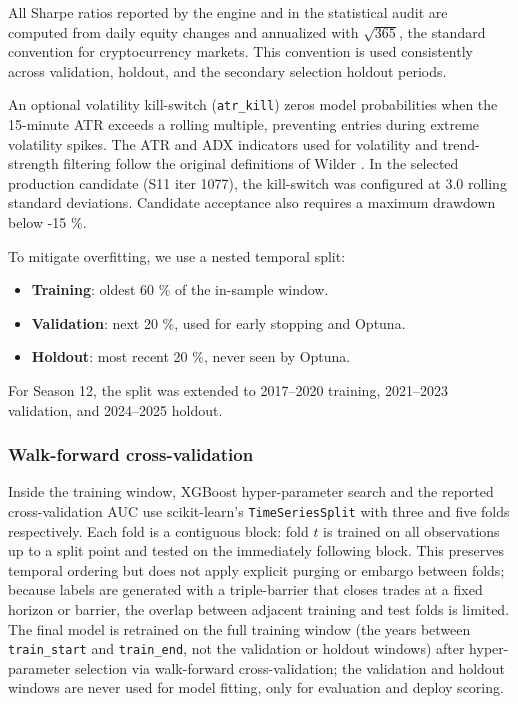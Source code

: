 \documentclass[analytics,article,submit,pdftex,moreauthors]{Definitions/mdpi}
\begin{document}
All Sharpe ratios reported by the engine and in the statistical audit are computed from daily equity changes and annualized with \(\sqrt{365}\), the standard convention for cryptocurrency markets. This convention is used consistently across validation, holdout, and the secondary selection holdout periods.

An optional volatility kill-switch (\texttt{atr\_kill}) zeros model probabilities when the 15-minute ATR exceeds a rolling multiple, preventing entries during extreme volatility spikes. The ATR and ADX indicators used for volatility and trend-strength filtering follow the original definitions of Wilder \citep{wilder_1978}. In the selected production candidate (S11 iter 1077), the kill-switch was configured at 3.0 rolling standard deviations. Candidate acceptance also requires a maximum drawdown below -15 \%.

To mitigate overfitting, we use a nested temporal split:

\begin{itemize}
\item
  \textbf{Training}: oldest 60 \% of the in-sample window.
\item
  \textbf{Validation}: next 20 \%, used for early stopping and Optuna.
\item
  \textbf{Holdout}: most recent 20 \%, never seen by Optuna.
\end{itemize}

For Season 12, the split was extended to 2017--2020 training, 2021--2023 validation, and 2024--2025 holdout.

\subsubsection{Walk-forward cross-validation}\label{walk-forward}

Inside the training window, XGBoost hyper-parameter search and the reported cross-validation AUC use scikit-learn's \texttt{TimeSeriesSplit} with three and five folds respectively. Each fold is a contiguous block: fold \(t\) is trained on all observations up to a split point and tested on the immediately following block. This preserves temporal ordering but does not apply explicit purging or embargo between folds; because labels are generated with a triple-barrier that closes trades at a fixed horizon or barrier, the overlap between adjacent training and test folds is limited. The final model is retrained on the full training window (the years between \texttt{train\_start} and \texttt{train\_end}, not the validation or holdout windows) after hyper-parameter selection via walk-forward cross-validation; the validation and holdout windows are never used for model fitting, only for evaluation and deploy scoring.
\end{document}
